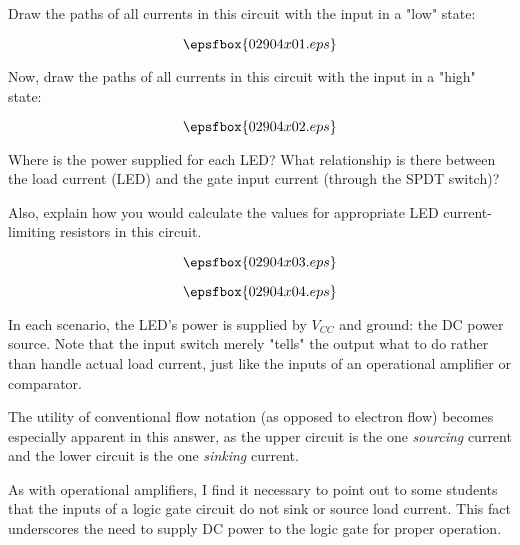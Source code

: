 

Draw the paths of all currents in this circuit with the input in a "low" state:

$$\epsfbox{02904x01.eps}$$

Now, draw the paths of all currents in this circuit with the input in a "high" state:

$$\epsfbox{02904x02.eps}$$

Where is the power supplied for each LED?  What relationship is there between the load current (LED) and the gate input current (through the SPDT switch)?

Also, explain how you would calculate the values for appropriate LED current-limiting resistors in this circuit.







$$\epsfbox{02904x03.eps}$$

$$\epsfbox{02904x04.eps}$$

In each scenario, the LED's power is supplied by $V_{CC}$ and ground: the DC power source.  Note that the input switch merely "tells" the output what to do rather than handle actual load current, just like the inputs of an operational amplifier or comparator.







The utility of conventional flow notation (as opposed to electron flow) becomes especially apparent in this answer, as the upper circuit is the one {\it sourcing} current and the lower circuit is the one {\it sinking} current.

As with operational amplifiers, I find it necessary to point out to some students that the inputs of a logic gate circuit do not sink or source load current.  This fact underscores the need to supply DC power to the logic gate for proper operation.




